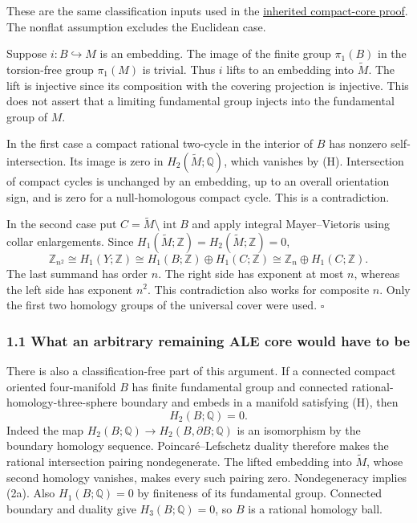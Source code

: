 \documentclass[
  11pt,
]{article}
\begin{document}
These are the same classification inputs used in the
\href{../mathematics/current/line1_aspherical_no_bubbles.md}{inherited
compact-core proof}. The nonflat assumption excludes the Euclidean case.

Suppose \(i:B\hookrightarrow M\) is an embedding. The image of the
finite group \(\pi_1(B)\) in the torsion-free group \(\pi_1(M)\) is
trivial. Thus \(i\) lifts to an embedding into \(\widetilde M\). The
lift is injective since its composition with the covering projection is
injective. This does not assert that a limiting fundamental group
injects into the fundamental group of \(M\).

In the first case a compact rational two-cycle in the interior of \(B\)
has nonzero self-intersection. Its image is zero in
\(H_2(\widetilde M;\mathbb Q)\), which vanishes by (H). Intersection of
compact cycles is unchanged by an embedding, up to an overall
orientation sign, and is zero for a null-homologous compact cycle. This
is a contradiction.

In the second case put \(C=\widetilde M\setminus\operatorname{int}B\)
and apply integral Mayer--Vietoris using collar enlargements. Since
\(H_1(\widetilde M;\mathbb Z)=H_2(\widetilde M;\mathbb Z)=0\), \[
 \mathbb Z_{n^2}\cong H_1(Y;\mathbb Z)
 \cong H_1(B;\mathbb Z)\oplus H_1(C;\mathbb Z)
 \cong\mathbb Z_n\oplus H_1(C;\mathbb Z).               \tag{2}
\] The last summand has order \(n\). The right side has exponent at most
\(n\), whereas the left side has exponent \(n^2\). This contradiction
also works for composite \(n\). Only the first two homology groups of
the universal cover were used. \(\square\)

\hypertarget{what-an-arbitrary-remaining-ale-core-would-have-to-be}{%
\subsubsection{1.1 What an arbitrary remaining ALE core would have to
be}\label{what-an-arbitrary-remaining-ale-core-would-have-to-be}}

There is also a classification-free part of this argument. If a
connected compact oriented four-manifold \(B\) has finite fundamental
group and connected rational-homology-three-sphere boundary and embeds
in a manifold satisfying (H), then \[
                         H_2(B;\mathbb Q)=0.             \tag{2a}
\] Indeed the map \(H_2(B;\mathbb Q)\to H_2(B,\partial B;\mathbb Q)\) is
an isomorphism by the boundary homology sequence. Poincaré--Lefschetz
duality therefore makes the rational intersection pairing nondegenerate.
The lifted embedding into \(\widetilde M\), whose second homology
vanishes, makes every such pairing zero. Nondegeneracy implies (2a).
Also \(H_1(B;\mathbb Q)=0\) by finiteness of its fundamental group.
Connected boundary and duality give \(H_3(B;\mathbb Q)=0\), so \(B\) is
a rational homology ball.
\end{document}
